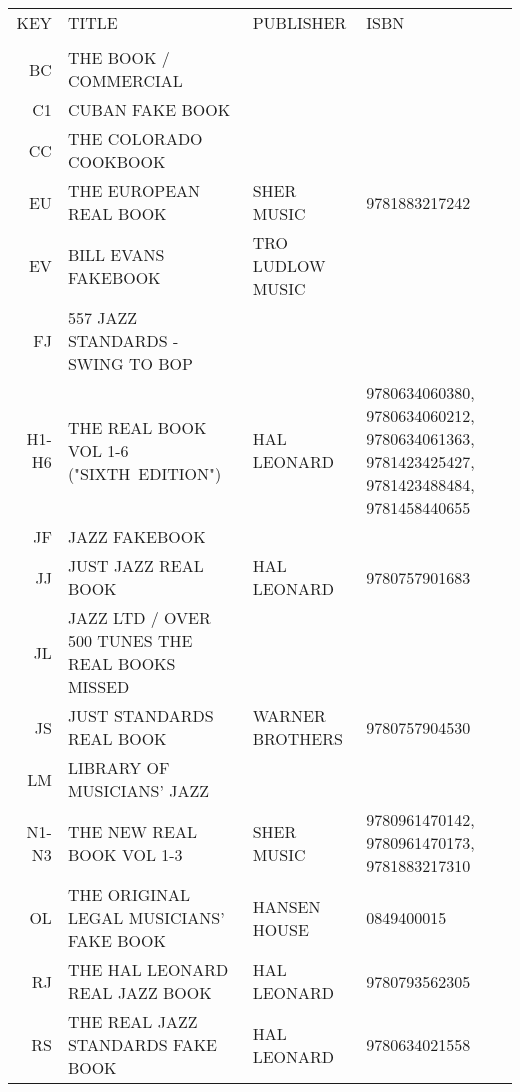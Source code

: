 \documentclass[8pt]{scrartcl}
\begin{document}
\selectfont
\begin{center}
  \begin{tabular}{rp{}p{}p{}}%
    KEY   & TITLE                                           & PUBLISHER         & ISBN \\
          &                                                 &                   & \\
    BC    & THE BOOK / COMMERCIAL                           &                   & \\
    C1    & CUBAN FAKE BOOK                                 &                   & \\
    CC    & THE COLORADO COOKBOOK                           &                   & \\
    EU    & THE EUROPEAN REAL BOOK                          & SHER MUSIC        & 9781883217242 \\
    EV    & BILL EVANS FAKEBOOK                             & TRO LUDLOW MUSIC  & \\
    FJ    & 557 JAZZ STANDARDS - SWING TO BOP               &                   & \\
    H1-H6 & THE REAL BOOK VOL 1-6 ("SIXTH~EDITION")         & HAL LEONARD       & 9780634060380, 9780634060212, 9780634061363, 9781423425427, 9781423488484, 9781458440655 \\
    JF    & JAZZ FAKEBOOK                                   &                   & \\
    JJ    & JUST JAZZ REAL BOOK                             & HAL LEONARD       & 9780757901683 \\
    JL    & JAZZ LTD / OVER 500 TUNES THE REAL BOOKS MISSED &                   & \\
    JS    & JUST STANDARDS REAL BOOK                        & WARNER BROTHERS   & 9780757904530 \\
    LM    & LIBRARY OF MUSICIANS’ JAZZ                      &                   & \\
    N1-N3 & THE NEW REAL BOOK VOL 1-3                       & SHER MUSIC        & 9780961470142, 9780961470173, 9781883217310 \\
    OL    & THE ORIGINAL LEGAL MUSICIANS' FAKE BOOK         & HANSEN HOUSE      & 0849400015 \\
    RJ    & THE HAL LEONARD REAL JAZZ BOOK                  & HAL LEONARD       & 9780793562305 \\
    RS    & THE REAL JAZZ STANDARDS FAKE BOOK               & HAL LEONARD       & 9780634021558 \\

\end{tabular}
\end{center}
\end{document}
